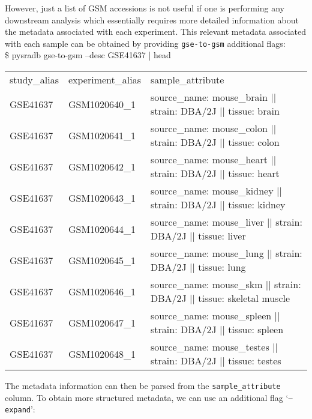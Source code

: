 \documentclass[9pt,a4paper]{extarticle}
\newenvironment{allintypewriter}{\ttfamily}{\par}
\begin{document}
However, just a list of GSM accessions is not useful if one is performing any downstream
analysis which essentially requires more detailed information about the metadata
associated with each experiment. This relevant metadata associated with each sample can be obtained by providing \texttt{gse-to-gsm} additional flags:\\

\begin{allintypewriter}
\$ pysradb gse-to-gsm --desc GSE41637 | head
\begin{table}[H]
    \begin{tabular}{lll}
        study_alias & experiment_alias & sample_attribute\\
        GSE41637 & GSM1020640_1 &  source_name: mouse_brain || strain: DBA/2J || tissue: brain\\
        GSE41637 & GSM1020641_1 &  source_name: mouse_colon || strain: DBA/2J || tissue: colon\\
        GSE41637 & GSM1020642_1 &  source_name: mouse_heart || strain: DBA/2J || tissue: heart\\
        GSE41637 & GSM1020643_1 &  source_name: mouse_kidney || strain: DBA/2J || tissue: kidney\\
        GSE41637 & GSM1020644_1 &  source_name: mouse_liver || strain: DBA/2J || tissue: liver\\
        GSE41637 & GSM1020645_1 &  source_name: mouse_lung || strain: DBA/2J || tissue: lung\\
        GSE41637 & GSM1020646_1 &  source_name: mouse_skm || strain: DBA/2J || tissue: skeletal muscle\\
        GSE41637 & GSM1020647_1 &  source_name: mouse_spleen || strain: DBA/2J || tissue: spleen\\
        GSE41637 & GSM1020648_1 &  source_name: mouse_testes || strain: DBA/2J || tissue: testes\\
    \end{tabular}
\end{table}
\end{allintypewriter}

The metadata information can then be parsed from the \texttt{sample\_attribute} column.
To obtain more structured metadata, we can use an additional flag `\texttt{--expand}':\\
\end{document}
